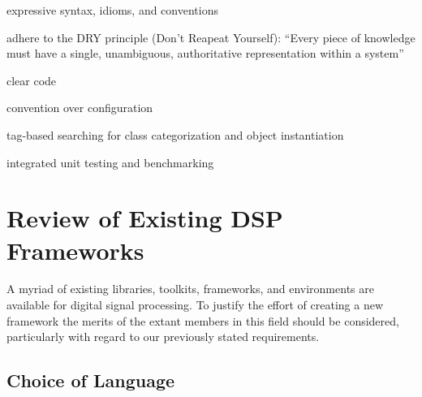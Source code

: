 \documentclass[twoside,10pt]{article}
\newenvironment{packed_item}{
\begin{itemize}
  \setlength{\itemsep}{1pt}
  \setlength{\parskip}{0pt}
  \setlength{\parsep}{0pt}
}{\end{itemize}}
\begin{document}
\begin{packed_item}%
	\item expressive syntax, idioms, and conventions
	\item adhere to the DRY principle (Don't Reapeat Yourself): ``Every piece of knowledge must have a single, unambiguous, authoritative representation within a system''\cite{Hunt:1999}
	\item clear code %
	\item convention over configuration
	\item tag-based searching for class categorization and object instantiation
	\item integrated unit testing and benchmarking %
\end{packed_item}%






\section{Review of Existing DSP Frameworks} %

A myriad of existing libraries, toolkits, frameworks, and environments are available for digital signal processing.  To justify the effort of creating a new framework the merits of the extant members in this field should be considered, particularly with regard to our previously stated requirements.


\subsection{Choice of Language} %
\end{document}
